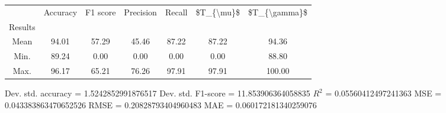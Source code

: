 \begin{tabular}{|c|c|c|c|c|c|c|}
\toprule
{} &  Accuracy &  F1 score &  Precision &  Recall &  \$T\_\{\textbackslash mu\}\$ &  \$T\_\{\textbackslash gamma\}\$ \\
Results &           &           &            &         &            &               \\
\hline
Mean    &     94.01 &     57.29 &      45.46 &   87.22 &      87.22 &         94.36 \\
Min.    &     89.24 &      0.00 &       0.00 &    0.00 &       0.00 &         88.80 \\
Max.    &     96.17 &     65.21 &      76.26 &   97.91 &      97.91 &        100.00 \\
\bottomrule
\end{tabular}

 Dev. std. accuracy = 1.5242852991876517
 Dev. std. F1-score = 11.853906364058835
 $R^2$ = 0.05560412497241363
 MSE = 0.043383863470652526
 RMSE = 0.20828793404960483
 MAE = 0.060172181340259076